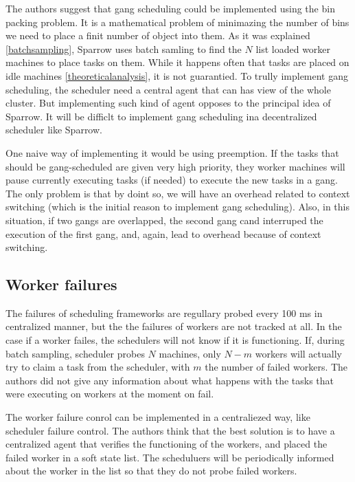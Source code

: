 \documentclass[11pt]{article}
\begin{document}
		The authors \cite[section 8]{sparrow} suggest that gang scheduling could be implemented using the bin packing problem. It is a mathematical problem of minimazing the number of bins we need to place a finit number of object into them. As it was explained \ref{batchsampling}, Sparrow uses batch samling to find the $N$ list loaded worker machines to place tasks on them. While it happens often that tasks are placed on idle machines \ref{theoreticalanalysis}, it is not guarantied. To trully implement gang scheduling, the scheduler need a central agent that can has view of the whole cluster. But implementing such kind of agent opposes to the principal idea of Sparrow. It will be difficlt to implement gang scheduling ina decentralized scheduler like Sparrow.
		
		One naive way of implementing it would be using preemption. If the tasks that should be gang-scheduled are given very high priority, they worker machines will pause currently executing tasks (if needed) to execute the new tasks in a gang. The only problem is that by doint so, we will have an overhead related to context switching (which is the initial reason to implement gang scheduling). Also, in this situation, if two gangs are overlapped, the second gang cand interruped the execution of the first gang, and, again, lead to overhead because of context switching.
		
		
	\subsection{Worker failures}
	
		The failures of scheduling frameworks are regullary probed every 100 ms in centralized manner, but the the failures of workers are not tracked at all. In the case if a worker failes, the schedulers will not know if it is functioning. If, during batch sampling, scheduler probes $N$ machines, only $N - m$ workers will actually try to claim a task from the scheduler, with $m$ the number of failed workers. The authors \cite{sparrow} did not give any information about what happens with the tasks that were executing on workers at the moment on fail.
		
		The worker failure conrol can be implemented in a centraliezed way, like scheduler failure control. The authors think that the best solution is to have a centralized agent that verifies the functioning of the workers, and placed the failed worker in a soft state list. The scheduluers will be periodically informed about the worker in the list so that they do not probe failed workers.
		
\end{document}
